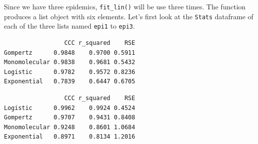 \documentclass[
  letterpaper,
  DIV=11,
  numbers=noendperiod]{scrreprt}
\newenvironment{Shaded}{\begin{snugshade}}{\end{snugshade}}
\newcommand{\AttributeTok}[1]{\textcolor[rgb]{0.40,0.45,0.13}{#1}}
\newcommand{\FunctionTok}[1]{\textcolor[rgb]{0.28,0.35,0.67}{#1}}
\newcommand{\NormalTok}[1]{\textcolor[rgb]{0.00,0.23,0.31}{#1}}
\newcommand{\OtherTok}[1]{\textcolor[rgb]{0.00,0.23,0.31}{#1}}
\newcommand{\SpecialCharTok}[1]{\textcolor[rgb]{0.37,0.37,0.37}{#1}}
\newcommand{\StringTok}[1]{\textcolor[rgb]{0.13,0.47,0.30}{#1}}
\begin{document}
Since we have three epidemics, \texttt{fit\_lin()} will be use three
times. The function produces a list object with six elements. Let's
first look at the \texttt{Stats} dataframe of each of the three lists
named \texttt{epi1} to \texttt{epi3}.

\begin{Shaded}
\end{Shaded}

\begin{verbatim}
                 CCC r_squared    RSE
Gompertz      0.9848    0.9700 0.5911
Monomolecular 0.9838    0.9681 0.5432
Logistic      0.9782    0.9572 0.8236
Exponential   0.7839    0.6447 0.6705
\end{verbatim}

\begin{Shaded}
\end{Shaded}

\begin{verbatim}
                 CCC r_squared    RSE
Logistic      0.9962    0.9924 0.4524
Gompertz      0.9707    0.9431 0.8408
Monomolecular 0.9248    0.8601 1.0684
Exponential   0.8971    0.8134 1.2016
\end{verbatim}

\begin{Shaded}
\end{Shaded}
\end{document}
